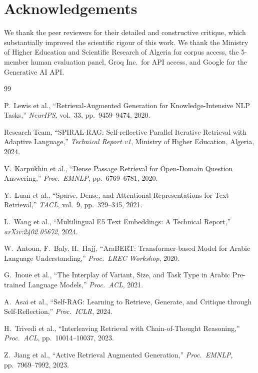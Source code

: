 \documentclass[12pt,a4paper]{article}
\begin{document}
\section*{Acknowledgements}

We thank the peer reviewers for their detailed and constructive critique, which
substantially improved the scientific rigour of this work. We thank the Ministry
of Higher Education and Scientific Research of Algeria for corpus access, the
5-member human evaluation panel, Groq Inc.\ for API access, and Google for the
Generative AI API.

\begin{thebibliography}{99}

P.~Lewis et al., ``Retrieval-Augmented Generation for Knowledge-Intensive NLP Tasks,''
\textit{NeurIPS}, vol.~33, pp.~9459--9474, 2020.

Research Team, ``SPIRAL-RAG: Self-reflective Parallel Iterative Retrieval with Adaptive Language,''
\textit{Technical Report v1}, Ministry of Higher Education, Algeria, 2024.

V.~Karpukhin et al., ``Dense Passage Retrieval for Open-Domain Question Answering,''
\textit{Proc.\ EMNLP}, pp.~6769--6781, 2020.

Y.~Luan et al., ``Sparse, Dense, and Attentional Representations for Text Retrieval,''
\textit{TACL}, vol.~9, pp.~329--345, 2021.

L.~Wang et al., ``Multilingual E5 Text Embeddings: A Technical Report,''
\textit{arXiv:2402.05672}, 2024.

W.~Antoun, F.~Baly, H.~Hajj, ``AraBERT: Transformer-based Model for Arabic Language Understanding,''
\textit{Proc.\ LREC Workshop}, 2020.

G.~Inoue et al., ``The Interplay of Variant, Size, and Task Type in Arabic Pre-trained Language Models,''
\textit{Proc.\ ACL}, 2021.

A.~Asai et al., ``Self-RAG: Learning to Retrieve, Generate, and Critique through Self-Reflection,''
\textit{Proc.\ ICLR}, 2024.

H.~Trivedi et al., ``Interleaving Retrieval with Chain-of-Thought Reasoning,''
\textit{Proc.\ ACL}, pp.~10014--10037, 2023.

Z.~Jiang et al., ``Active Retrieval Augmented Generation,''
\textit{Proc.\ EMNLP}, pp.~7969--7992, 2023.


\end{thebibliography}
\end{document}
